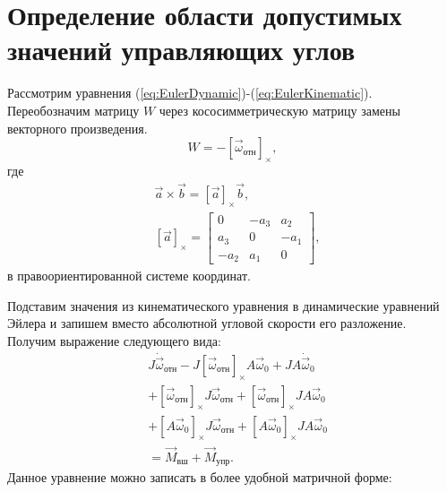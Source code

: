 \section{Определение области допустимых значений управляющих углов}
\noindent\indent Рассмотрим уравнения (\ref{eq:EulerDynamic})-(\ref{eq:EulerKinematic}).
Переобозначим матрицу $W$ через кососимметрическую матрицу замены векторного произведения.
\begin{equation}
    W = -[\vec{\omega}_{\text{отн}}]_{\times},
\end{equation}
где
\begin{equation}
    \begin{aligned}
        & \vec{a}\times\vec{b} = [\vec{a}]_{\times}\vec{b}, \\
        & [\vec{a}]_{\times} = \begin{bmatrix}
            0 & -a_3 & a_2 \\
            a_3 & 0 & -a_1 \\
            -a_2 & a_1 & 0
        \end{bmatrix},
    \end{aligned}
\end{equation}
в правоориентированной системе координат.\par
Подставим значения из кинематического уравнения в динамические уравнений Эйлера
и запишем вместо абсолютной угловой скорости его разложение. Получим выражение
следующего вида:
\begin{equation}
    \begin{aligned}
        & J\dot{\vec{\omega}}_{\text{отн}} - J[\vec{\omega}_{\text{отн}}]_{\times} A \vec{\omega}_0 + J A \dot{\vec{\omega}}_0 \\
        & + [\vec{\omega}_{\text{отн}}]_{\times} J \vec{\omega}_{\text{отн}} + [\vec{\omega}_{\text{отн}}]_{\times} J A \vec{\omega}_0 \\
        & + [A\vec{\omega}_0]_{\times} J \vec{\omega}_{\text{отн}} + [A\vec{\omega}_0]_{\times} J A \vec{\omega}_0 \\
        & = \vec{M}_{\text{вш}} + \vec{M}_{\text{упр}}.
    \end{aligned}
\end{equation}
Данное уравнение можно записать в более удобной матричной форме:
